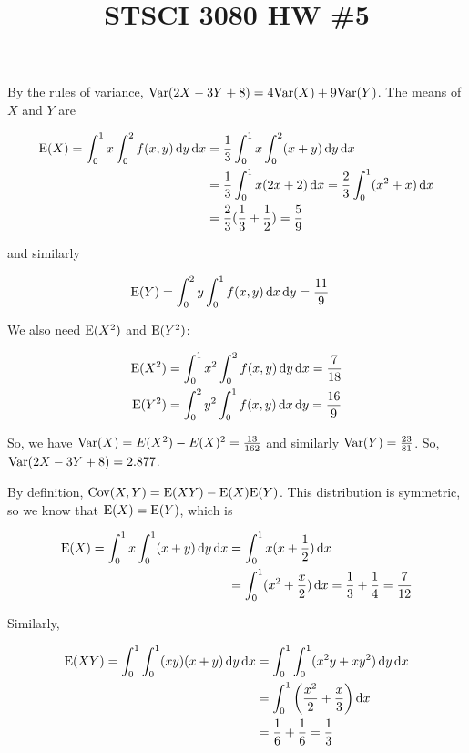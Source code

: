

\title{STSCI 3080 HW \#5}
\author{\name}
\maketitle


By the rules of variance, $\mathrm{Var}(2X - 3Y + 8) = 4\mathrm{Var}(X) + 9\mathrm{Var}(Y)$. The means of $X$ and $Y$ are

\begin{align*}
  \mathrm{E}(X) = \int_0^1 x \int_0^2 f(x, y) \mathop{}\!\mathrm{d} y \mathop{}\!\mathrm{d} x &= \frac{1}{3} \int_0^1 x \int_0^2 (x + y) \mathop{}\!\mathrm{d} y \mathop{}\!\mathrm{d} x \\
  &= \frac{1}{3} \int_0^1 x (2x + 2) \mathop{}\!\mathrm{d} x = \frac{2}{3} \int_0^1 (x^2 + x) \mathop{}\!\mathrm{d} x \\
  &= \frac{2}{3} (\frac{1}{3} + \frac{1}{2}) = \frac{5}{9}
\end{align*}

and similarly

\begin{align*}
  \mathrm{E}(Y) = \int_0^2 y \int_0^1 f(x, y) \mathop{}\!\mathrm{d} x \mathop{}\!\mathrm{d} y &= \frac{11}{9}
\end{align*}

We also need $\mathrm{E}(X^2)$ and $\mathrm{E}(Y^2)$:

\begin{align*}
  \mathrm{E}(X^2) &= \int_0^1 x^2 \int_0^2 f(x, y) \mathop{}\!\mathrm{d} y \mathop{}\!\mathrm{d} x = \frac{7}{18} \\
  \mathrm{E}(Y^2) &= \int_0^2 y^2 \int_0^1 f(x, y) \mathop{}\!\mathrm{d} x \mathop{}\!\mathrm{d} y = \frac{16}{9}
\end{align*}

So, we have $\mathrm{Var}(X) = E(X^2) - E(X)^2 = \frac{13}{162}$ and similarly $\mathrm{Var}(Y) = \frac{23}{81}$. So, $\mathrm{Var}(2X - 3Y + 8) = 2.877$.

By definition, $\mathrm{Cov}(X, Y) = \mathrm{E}(XY) - \mathrm{E}(X)\mathrm{E}(Y)$. This distribution is symmetric, so we know that $\mathrm{E}(X) = \mathrm{E}(Y)$, which is

\begin{align*}
  \mathrm{E}(X) = \int_0^1 x \int_0^1 (x + y) \mathop{}\!\mathrm{d} y \mathop{}\!\mathrm{d} x &= \int_0^1 x(x + \frac{1}{2}) \mathop{}\!\mathrm{d} x \\
  &= \int_0^1 (x^2 + \frac{x}{2}) \mathop{}\!\mathrm{d} x = \frac{1}{3} + \frac{1}{4} = \frac{7}{12}
\end{align*}

Similarly,

\begin{align*}
  \mathrm{E}(XY) = \int_0^1 \int_0^1 (xy)(x + y) \mathop{}\!\mathrm{d} y \mathop{}\!\mathrm{d} x &= \int_0^1 \int_0^1 (x^2y + xy^2) \mathop{}\!\mathrm{d} y \mathop{}\!\mathrm{d} x \\
  &= \int_0^1 \left(\frac{x^2}{2} + \frac{x}{3}\right) \mathop{}\!\mathrm{d} x \\
  &= \frac{1}{6} + \frac{1}{6} = \frac{1}{3}
\end{align*}

